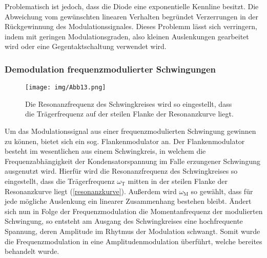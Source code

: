 Problematisch ist jedoch, dass die Diode eine exponentielle Kennline besitzt. Die Abweichung vom gewünschten linearen Verhalten begründet Verzerrungen in der Rückgewinnung des Modulationssignales. Dieses Problemm lässt sich verringern, indem mit geringen Modulationsgraden, also kleinen Auslenkungen gearbeitet wird oder eine Gegentaktschaltung verwendet wird.

\subsubsection{Demodulation frequenzmodulierter Schwingungen}

\begin{figure}
	\centering
	\texttt{[image: img/Abb13.png]}
	\caption{Die Resonanzfrequenz des Schwingkreises wird so eingestellt, dass die Trägerfrequenz auf der steilen Flanke der Resonanzkurve liegt. \cite{FP}}
	\label{resonanzkurve}
\end{figure}

Um das Modulationssignal aus einer frequenzmodulierten Schwingung gewinnen zu können, bietet sich ein sog. Flankenmodulator an. Der Flankenmodulator besteht im wesentlichen aus einem Schwingkreis, in welchem die Frequenzabhängigkeit der Kondensatorspannung im Falle erzungener Schwingung ausgenutzt wird. Hierfür wird die Resonanzfrequenz des Schwingkreises so eingestellt, dass die Trägerfrequenz $\omega_\text{T}$ mitten in der steilen Flanke der Resonanzkurve liegt (\autoref{resonanzkurve}). Außerdem wird $\omega_\text{M}$ so gewählt, dass für jede mögliche Auslenkung ein linearer Zusammenhang bestehen bleibt. Ändert sich nun in Folge der Frequenzmodulation die Momentanfrequenz der modulierten Schwingung, so entsteht am Ausgang des Schwingkreises eine hochfrequente Spannung, deren Amplitude im Rhytmus der Modulation schwangt. Somit wurde die Frequenzmodulation in eine Amplitudenmodulation überführt, welche bereites behandelt wurde.
